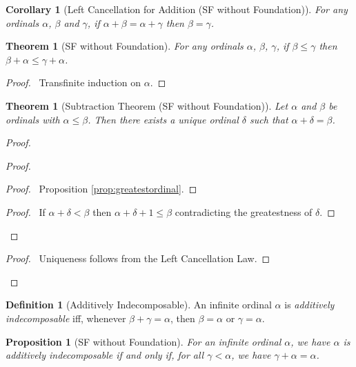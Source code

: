 \documentclass{book}
\let\qed\relax
\newtheorem{prop}[ax]{Proposition}
\newtheorem{cor}{Corollary}[ax]
\newtheorem{thm}[ax]{Theorem}
\theoremstyle{definition}
\newtheorem{df}[ax]{Definition}
\begin{document}
\begin{cor}[Left Cancellation for Addition (SF without Foundation)]
For any ordinals $\alpha$, $\beta$ and $\gamma$, if $\alpha + \beta = \alpha + \gamma$ then $\beta = \gamma$.
\end{cor}

\begin{thm}[SF without Foundation]
For any ordinals $\alpha$, $\beta$, $\gamma$, if $\beta \leq \gamma$ then $\beta + \alpha \leq \gamma + \alpha$.
\end{thm}

\begin{proof}
\pf\ Transfinite induction on $\alpha$. \qed
\end{proof}

\begin{thm}[Subtraction Theorem (SF without Foundation)]
Let $\alpha$ and $\beta$ be ordinals with $\alpha \leq \beta$. Then there exists a unique ordinal $\delta$ such that $\alpha + \delta = \beta$.
\end{thm}

\begin{proof}
\pf
{}
\begin{proof}
	\begin{proof}
		\pf\ Proposition \ref{prop:greatestordinal}.
	\end{proof}
	\begin{proof}
		\pf\ If $\alpha + \delta < \beta$ then $\alpha + \delta + 1 \leq \beta$ contradicting the greatestness of $\delta$.
	\end{proof}
\end{proof}
\qedstep
\begin{proof}
	\pf\ Uniqueness follows from the Left Cancellation Law.
\end{proof}
\qed
\end{proof}

\begin{df}[Additively Indecomposable]
An infinite ordinal $\alpha$ is \emph{additively indecomposable} iff, whenever $\beta + \gamma = \alpha$, then $\beta = \alpha$ or $\gamma = \alpha$.
\end{df}

\begin{prop}[SF without Foundation]
For an infinite ordinal $\alpha$, we have $\alpha$ is additively indecomposable if and only if, for all $\gamma < \alpha$, we have $\gamma + \alpha = \alpha$.
\end{prop}
\end{document}
